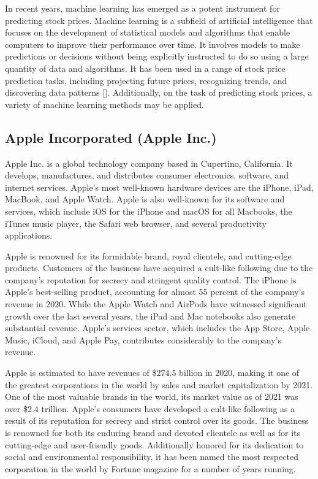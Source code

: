 \documentclass[a4paper]{article}
\begin{document}
In recent years, machine learning has emerged as a potent instrument for predicting stock prices. Machine learning is a subfield of artificial intelligence that focuses on the development of statistical models and algorithms that enable computers to improve their performance over time. It involves  models to make predictions or decisions without being explicitly instructed to do so using a large quantity of data and algorithms. It has been used in a range of stock price prediction tasks, including projecting future prices, recognizing trends, and discovering data patterns [\cite{leung2014machine, patel2015predicting, ampomah2020evaluation}]. Additionally, on the task of predicting stock prices, a variety of machine learning methods may be applied. 
\subsection{Apple Incorporated (Apple Inc.)}
Apple Inc. is a global technology company based in Cupertino, California. It develops, manufactures, and distributes consumer electronics, software, and internet services. Apple's most well-known hardware devices are the iPhone, iPad, MacBook, and Apple Watch. Apple is also well-known for its software and services, which include iOS for the iPhone and macOS for all Macbooks, the iTunes music player, the Safari web browser, and several productivity applications.


Apple is renowned for its formidable brand, royal clientele, and cutting-edge products. Customers of the business have acquired a cult-like following due to the company's reputation for secrecy and stringent quality control. The iPhone is Apple's best-selling product, accounting for almost 55 percent of the company's revenue in 2020. While the Apple Watch and AirPods have witnessed significant growth over the last several years, the iPad and Mac notebooks also generate substantial revenue. Apple's services sector, which includes the App Store, Apple Music, iCloud, and Apple Pay, contributes considerably to the company's revenue.

Apple is estimated to have revenues of \$274.5 billion in 2020, making it one of the greatest corporations in the world by sales and market capitalization by 2021. One of the most valuable brands in the world, its market value as of 2021 was over \$2.4 trillion. Apple's consumers have developed a cult-like following as a result of its reputation for secrecy and strict control over its goods. The business is renowned for both its enduring brand and devoted clientele as well as for its cutting-edge and user-friendly goods. Additionally honored for its dedication to social and environmental responsibility, it has been named the most respected corporation in the world by Fortune magazine for a number of years running.
\end{document}
